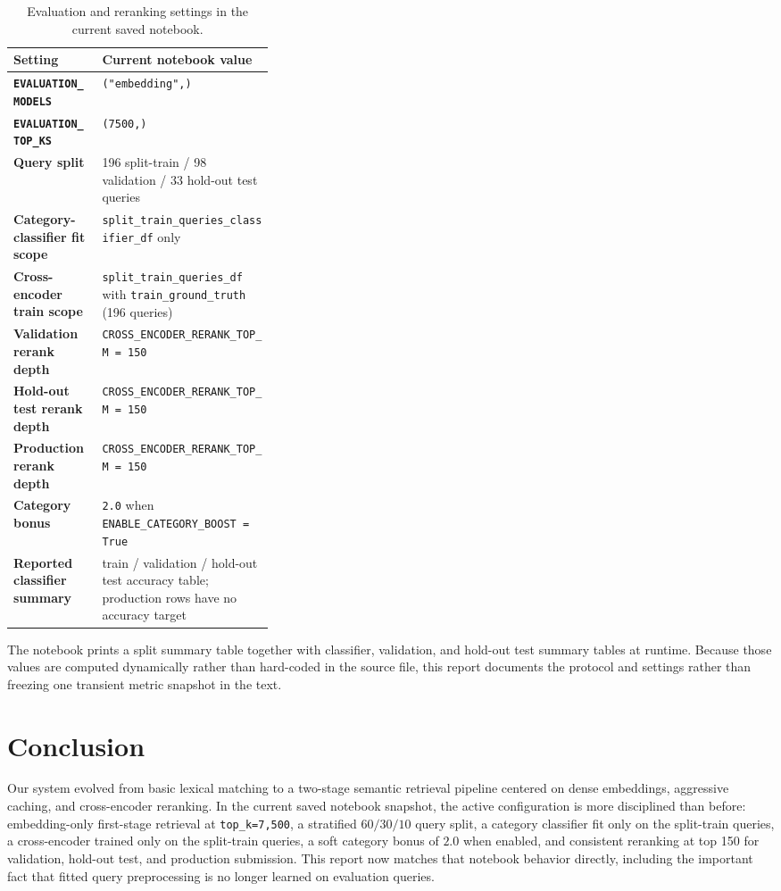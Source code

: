 \documentclass[11pt,a4paper]{article}
\begin{document}
\begin{table}[H]
\centering
\small
\begin{tabularx}{\linewidth}{>{\bfseries}p{0.34\linewidth}Y}
\toprule
Setting & Current notebook value \\
\midrule
\texttt{EVALUATION\_MODELS} & \texttt{("embedding",)} \\
\texttt{EVALUATION\_TOP\_KS} & \texttt{(7500,)} \\
Query split & 196 split-train / 98 validation / 33 hold-out test queries \\
Category-classifier fit scope & \texttt{split\_train\_queries\_classifier\_df} only \\
Cross-encoder train scope & \texttt{split\_train\_queries\_df} with \texttt{train\_ground\_truth} (196 queries) \\
Validation rerank depth & \texttt{CROSS\_ENCODER\_RERANK\_TOP\_M = 150} \\
Hold-out test rerank depth & \texttt{CROSS\_ENCODER\_RERANK\_TOP\_M = 150} \\
Production rerank depth & \texttt{CROSS\_ENCODER\_RERANK\_TOP\_M = 150} \\
Category bonus & \texttt{2.0} when \texttt{ENABLE\_CATEGORY\_BOOST = True} \\
Reported classifier summary & train / validation / hold-out test accuracy table; production rows have no accuracy target \\
\bottomrule
\end{tabularx}
\caption{Evaluation and reranking settings in the current saved notebook.}
\end{table}

The notebook prints a split summary table together with classifier, validation, and hold-out test summary tables at runtime. Because those values are computed dynamically rather than hard-coded in the source file, this report documents the protocol and settings rather than freezing one transient metric snapshot in the text.

\section{Conclusion}

Our system evolved from basic lexical matching to a two-stage semantic retrieval pipeline centered on dense embeddings, aggressive caching, and cross-encoder reranking. In the current saved notebook snapshot, the active configuration is more disciplined than before: embedding-only first-stage retrieval at \texttt{top\_k=7,500}, a stratified \(60/30/10\) query split, a category classifier fit only on the split-train queries, a cross-encoder trained only on the split-train queries, a soft category bonus of \(2.0\) when enabled, and consistent reranking at top 150 for validation, hold-out test, and production submission. This report now matches that notebook behavior directly, including the important fact that fitted query preprocessing is no longer learned on evaluation queries.
\end{document}
